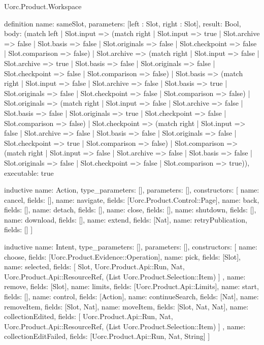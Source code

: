 \begin{lexlean}{Uorc.Product.Workspace}
\begin{semanticmodule}
definition{
  name: sameSlot,
  parameters: [left : Slot, right : Slot],
  result: Bool,
  body: (match left
    | Slot.input => (match right
      | Slot.input => true
      | Slot.archive => false
      | Slot.basis => false
      | Slot.originals => false
      | Slot.checkpoint => false
      | Slot.comparison => false)
    | Slot.archive => (match right
      | Slot.input => false
      | Slot.archive => true
      | Slot.basis => false
      | Slot.originals => false
      | Slot.checkpoint => false
      | Slot.comparison => false)
    | Slot.basis => (match right
      | Slot.input => false
      | Slot.archive => false
      | Slot.basis => true
      | Slot.originals => false
      | Slot.checkpoint => false
      | Slot.comparison => false)
    | Slot.originals => (match right
      | Slot.input => false
      | Slot.archive => false
      | Slot.basis => false
      | Slot.originals => true
      | Slot.checkpoint => false
      | Slot.comparison => false)
    | Slot.checkpoint => (match right
      | Slot.input => false
      | Slot.archive => false
      | Slot.basis => false
      | Slot.originals => false
      | Slot.checkpoint => true
      | Slot.comparison => false)
    | Slot.comparison => (match right
      | Slot.input => false
      | Slot.archive => false
      | Slot.basis => false
      | Slot.originals => false
      | Slot.checkpoint => false
      | Slot.comparison => true)),
  executable: true
}

inductive{
  name: Action,
  type_parameters: [],
  parameters: [],
  constructors: [
    {name: cancel, fields: []},
    {name: navigate, fields: [Uorc.Product.Control::Page]},
    {name: back, fields: []},
    {name: detach, fields: []},
    {name: close, fields: []},
    {name: shutdown, fields: []},
    {name: download, fields: []},
    {name: extend, fields: [Nat]},
    {name: retryPublication, fields: []}
  ]
}

inductive{
  name: Intent,
  type_parameters: [],
  parameters: [],
  constructors: [
    {name: choose, fields: [Uorc.Product.Evidence::Operation]},
    {name: pick, fields: [Slot]},
    {
      name: selected,
      fields: [
        Slot,
        Uorc.Product.Api::Run,
        Nat,
        Uorc.Product.Api::ResourceRef,
        (List Uorc.Product.Selection::Item)
      ]
    },
    {name: remove, fields: [Slot]},
    {name: limits, fields: [Uorc.Product.Api::Limits]},
    {name: start, fields: []},
    {name: control, fields: [Action]},
    {name: continueSearch, fields: [Nat]},
    {name: removeItem, fields: [Slot, Nat]},
    {name: moveItem, fields: [Slot, Nat, Nat]},
    {
      name: collectionEdited,
      fields: [
        Uorc.Product.Api::Run,
        Nat,
        Uorc.Product.Api::ResourceRef,
        (List Uorc.Product.Selection::Item)
      ]
    },
    {name: collectionEditFailed, fields: [Uorc.Product.Api::Run, Nat, String]}
  ]
}


\end{semanticmodule}
\end{lexlean}
